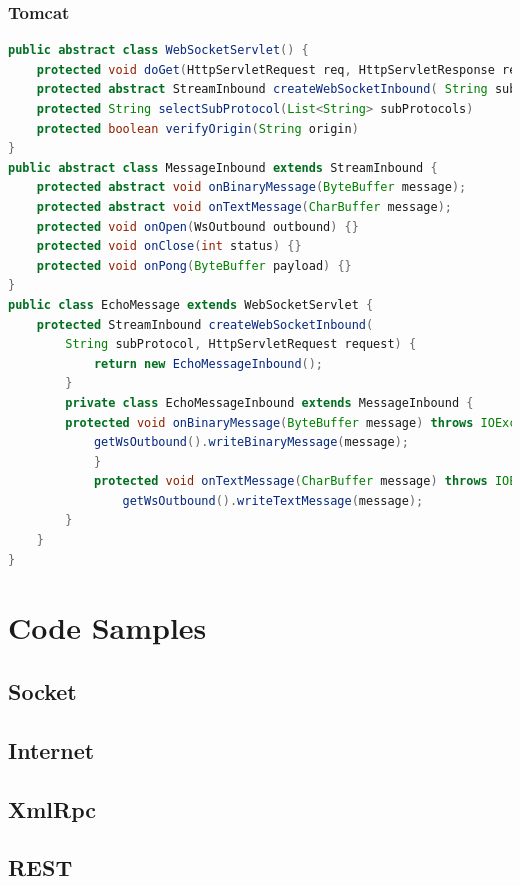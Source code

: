 \documentclass[10pt]{article}
\begin{document}
\subsubsection{Tomcat}
\begin{lstlisting}[language=Java, caption=Echo Server, style=JavaStyle]
public abstract class WebSocketServlet() {
	protected void doGet(HttpServletRequest req, HttpServletResponse resp) {...}
	protected abstract StreamInbound createWebSocketInbound( String subProtocol, HttpServletRequest request);
	protected String selectSubProtocol(List<String> subProtocols)
	protected boolean verifyOrigin(String origin)
}
public abstract class MessageInbound extends StreamInbound {
	protected abstract void onBinaryMessage(ByteBuffer message);
	protected abstract void onTextMessage(CharBuffer message);
	protected void onOpen(WsOutbound outbound) {} 
	protected void onClose(int status) {} 	
	protected void onPong(ByteBuffer payload) {}
}
public class EchoMessage extends WebSocketServlet {
	protected StreamInbound createWebSocketInbound(
		String subProtocol, HttpServletRequest request) {
			return new EchoMessageInbound();
		}
		private class EchoMessageInbound extends MessageInbound {
		protected void onBinaryMessage(ByteBuffer message) throws IOException {
			getWsOutbound().writeBinaryMessage(message);
    		}
    		protected void onTextMessage(CharBuffer message) throws IOException {
    			getWsOutbound().writeTextMessage(message);
		}
	}
}
\end{lstlisting}

\newpage
\section{Code Samples}
\subsection{Socket}


\subsection{Internet}


\subsection{XmlRpc}


\subsection{REST}


\end{document}
